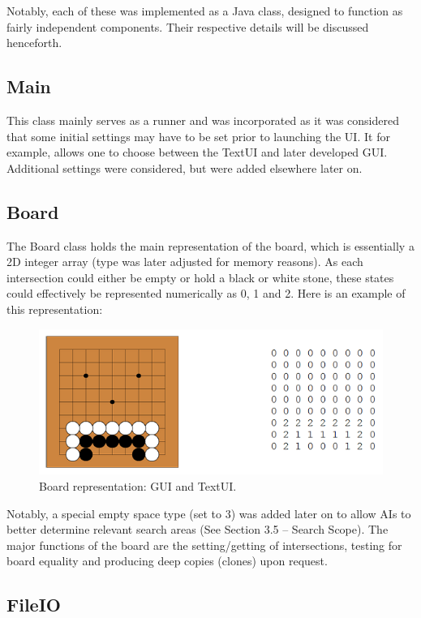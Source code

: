 \documentclass{l3proj}
\begin{document}
Notably, each of these was implemented as a Java class, designed to function as fairly independent components. Their respective details will be discussed henceforth.

\subsection{Main}

This class mainly serves as a runner and was incorporated as it was considered that some initial settings may have to be set prior to launching the UI. It for example, allows one to choose between the TextUI and later developed GUI. Additional settings were considered, but were added elsewhere later on.

\subsection{Board}

The Board class holds the main representation of the board, which is essentially a 2D integer array (type was later adjusted for memory reasons). As each intersection could either be empty or hold a black or white stone, these states could effectively be represented numerically as 0, 1 and 2. Here is an example of this representation:

\begin{figure}[H]
\centering
\includegraphics[scale=1]{Images/GE-BoardRep.png}
\caption{Board representation: GUI and TextUI.}
\end{figure}

Notably, a special empty space type (set to 3) was added later on to allow AIs to better determine relevant search areas (See Section 3.5 – Search Scope). The major functions of the board are the setting/getting of intersections, testing for board equality and producing deep copies (clones) upon request. 

\subsection{FileIO}
\end{document}
